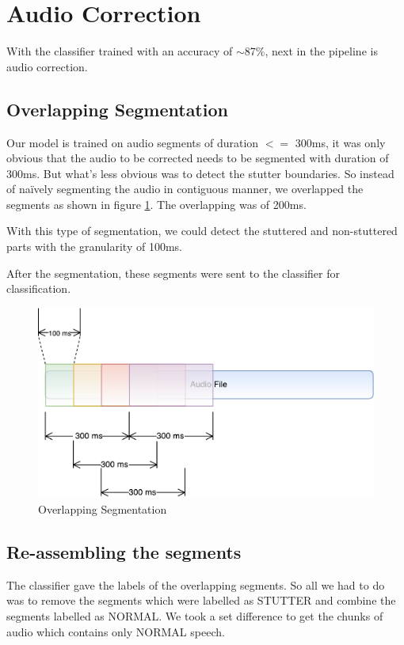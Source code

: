 \documentclass{report}
\begin{document}
\section{Audio Correction}
With the classifier trained with an accuracy of $\sim$87\%, next in the pipeline is audio correction.

\subsection{Overlapping Segmentation}
Our model is trained on audio segments of duration $<=$ 300ms, it was only obvious that the audio to be corrected needs to be segmented with duration of 300ms. But what's less obvious was to detect the stutter boundaries. So instead of na\"ively segmenting the audio in contiguous manner, we overlapped the segments as shown in figure \ref{fig:overlappingSegmentation}. The overlapping was of 200ms.

With this type of segmentation, we could detect the stuttered and non-stuttered parts with the granularity of 100ms.

After the segmentation, these segments were sent to the classifier for classification.

\begin{figure}[ht]
    \centering
    \includegraphics[scale=0.7]{OverlappingSplits300ms.pdf}
    \caption{Overlapping Segmentation}
    \label{fig:overlappingSegmentation}
\end{figure}

\subsection{Re-assembling the segments}
The classifier gave the labels of the overlapping segments. So all we had to do was to remove the segments which were labelled as STUTTER and combine the segments labelled as NORMAL. We took a set difference to get the chunks of audio which contains only NORMAL speech.
\end{document}

